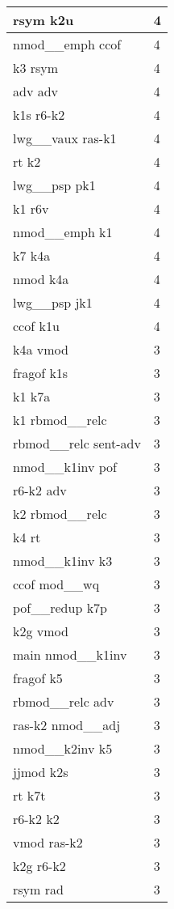\documentclass[a4 paper]{article}
\begin{document}
\begin{longtable}{p{}p{}}
rsym k2u  & 4 \\ \midrule
nmod\_\_emph ccof  & 4 \\ \midrule
k3 rsym  & 4 \\ \midrule
adv adv  & 4 \\ \midrule
k1s r6-k2  & 4 \\ \midrule
lwg\_\_vaux ras-k1  & 4 \\ \midrule
rt k2  & 4 \\ \midrule
lwg\_\_psp pk1  & 4 \\ \midrule
k1 r6v  & 4 \\ \midrule
nmod\_\_emph k1  & 4 \\ \midrule
k7 k4a  & 4 \\ \midrule
nmod k4a  & 4 \\ \midrule
lwg\_\_psp jk1  & 4 \\ \midrule
ccof k1u  & 4 \\ \midrule
k4a vmod  & 3 \\ \midrule
fragof k1s  & 3 \\ \midrule
k1 k7a  & 3 \\ \midrule
k1 rbmod\_\_relc  & 3 \\ \midrule
rbmod\_\_relc sent-adv  & 3 \\ \midrule
nmod\_\_k1inv pof  & 3 \\ \midrule
r6-k2 adv  & 3 \\ \midrule
k2 rbmod\_\_relc  & 3 \\ \midrule
k4 rt  & 3 \\ \midrule
nmod\_\_k1inv k3  & 3 \\ \midrule
ccof mod\_\_wq  & 3 \\ \midrule
pof\_\_redup k7p  & 3 \\ \midrule
k2g vmod  & 3 \\ \midrule
main nmod\_\_k1inv  & 3 \\ \midrule
fragof k5  & 3 \\ \midrule
rbmod\_\_relc adv  & 3 \\ \midrule
ras-k2 nmod\_\_adj  & 3 \\ \midrule
nmod\_\_k2inv k5  & 3 \\ \midrule
jjmod k2s  & 3 \\ \midrule
rt k7t  & 3 \\ \midrule
r6-k2 k2  & 3 \\ \midrule
vmod ras-k2  & 3 \\ \midrule
k2g r6-k2  & 3 \\ \midrule
rsym rad  & 3 \\ \midrule

\end{longtable}
\end{document}
